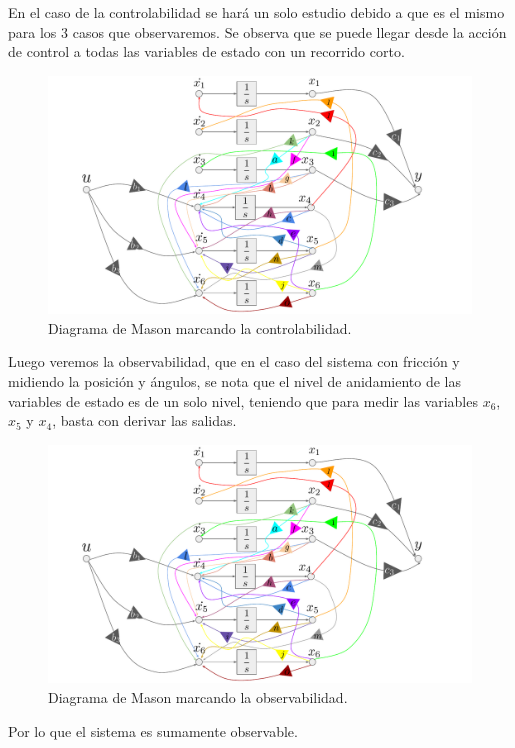 En el caso de la controlabilidad se hará un solo estudio debido a que es el mismo para los 3 casos que observaremos. Se observa que se puede llegar desde la acción de control a todas las variables de estado con un recorrido corto.
\begin{figure}[H]
	\centering
	\includegraphics[width=1\linewidth,page = 2]{../Modelo Teorico/ImagenesModelo Teorico/Mason.pdf}
	\caption{Diagrama de Mason marcando la controlabilidad.}	
	\label{fig:masonsisfyxofmC}
\end{figure}
Luego veremos la observabilidad, que en el caso del sistema con fricción y midiendo la posición y ángulos, se nota que el nivel de anidamiento de las variables de estado es de un solo nivel, teniendo que para medir las variables $x_6$, $x_5$ y $x_4$, basta con derivar las salidas. 
\begin{figure}[H]
	\centering
	\includegraphics[width=1\linewidth,page = 3]{../Modelo Teorico/ImagenesModelo Teorico/Mason.pdf}
	\caption{Diagrama de Mason marcando la observabilidad.}	
	\label{fig:masonsisfyxofmO}
\end{figure}
Por lo que el sistema es sumamente observable.
